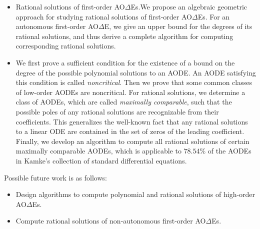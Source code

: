 \documentclass[10pt,a4paper]{article}
\newcommand{\AODE}{{AO{$\Delta$}E}}
\newcommand{\AODEs}{{AO{$\Delta$}Es}}
\begin{document}
\begin{itemize}
\item Rational solutions of first-order \AODEs.We propose an algebraic geometric approach for studying rational solutions of first-order \AODEs. 
For an autonomous first-order \AODE, we give an upper bound for the degrees of its rational solutions, and thus derive a complete algorithm for 
computing corresponding rational solutions.

\item We first prove a sufficient condition for the existence of a bound on the degree of the possible polynomial solutions to an AODE.
An AODE satisfying this condition is called \emph{noncritical}. 
Then we prove that some common classes of low-order AODEs are noncritical.
For rational solutions, we determine a class of AODEs, which are called \emph{maximally comparable}, 
such that the possible poles of any rational solutions are recognizable from their coefficients. 
This generalizes the well-known fact that any rational solutions to a linear ODE are contained in the set of zeros of the leading coefficient.
Finally, we develop an algorithm to compute all rational solutions of certain maximally comparable AODEs, 
which is applicable to $78.54\%$ of the AODEs in Kamke's collection of standard differential equations.
\end{itemize}

Possible future work is as follows: 

\begin{itemize}
\item  Design algorithms to compute polynomial and rational solutions of high-order \AODEs.
\item Compute rational solutions of non-autonomous first-order \AODEs. 
\end{itemize}	
\end{document}
